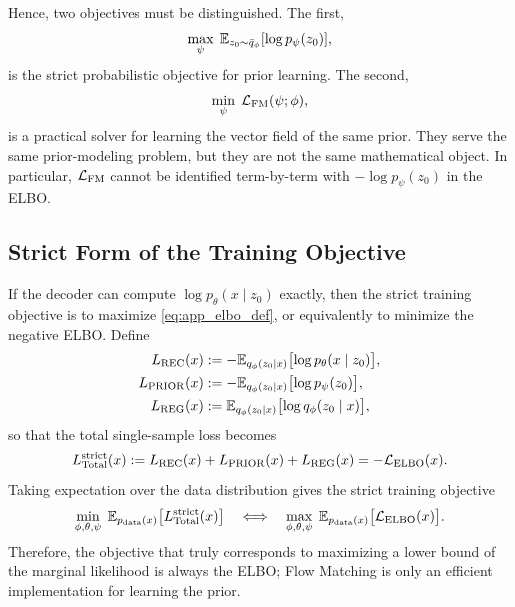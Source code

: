 Hence, two objectives must be distinguished. The first,
\begin{equation}
\max_{\psi}\;\mathbb{E}_{z_0\sim \bar q_{\phi}}[\log p_{\psi}(z_0)],
\label{eq:app_strict_prior_nll}
\end{equation}
is the strict probabilistic objective for prior learning. The second,
\begin{equation}
\min_{\psi}\;\mathcal{L}_{\mathrm{FM}}(\psi;\phi),
\label{eq:app_fm_solver_obj}
\end{equation}
is a practical solver for learning the vector field of the same prior. They serve the same prior-modeling problem, but they are not the same mathematical object. In particular, $\mathcal{L}_{\mathrm{FM}}$ cannot be identified term-by-term with $-\log p_{\psi}(z_0)$ in the ELBO.

\subsection{Strict Form of the Training Objective}
\label{app:training_objective}

If the decoder can compute $\log p_{\theta}(x\mid z_0)$ exactly, then the strict training objective is to maximize \eqref{eq:app_elbo_def}, or equivalently to minimize the negative ELBO. Define
\begin{align}
L_{\mathrm{REC}}(x)
&:= -\mathbb{E}_{q_{\phi}(z_0\mid x)}\bigl[\log p_{\theta}(x\mid z_0)\bigr],
\label{eq:app_l_rec}\\
L_{\mathrm{PRIOR}}(x)
&:= -\mathbb{E}_{q_{\phi}(z_0\mid x)}\bigl[\log p_{\psi}(z_0)\bigr],
\label{eq:app_l_prior}\\
L_{\mathrm{REG}}(x)
&:= \mathbb{E}_{q_{\phi}(z_0\mid x)}\bigl[\log q_{\phi}(z_0\mid x)\bigr],
\label{eq:app_l_reg}
\end{align}
so that the total single-sample loss becomes
\begin{equation}
L_{\mathrm{Total}}^{\mathrm{strict}}(x)
:=
L_{\mathrm{REC}}(x)+L_{\mathrm{PRIOR}}(x)+L_{\mathrm{REG}}(x)
=
-\mathcal{L}_{\mathrm{ELBO}}(x).
\label{eq:app_l_total_strict}
\end{equation}
Taking expectation over the data distribution gives the strict training objective
\begin{equation}
\min_{\phi,\theta,\psi}\;\mathbb{E}_{p_{\mathrm{data}}(x)}\bigl[L_{\mathrm{Total}}^{\mathrm{strict}}(x)\bigr]
\quad\Longleftrightarrow\quad
\max_{\phi,\theta,\psi}\;\mathbb{E}_{p_{\mathrm{data}}(x)}\bigl[\mathcal{L}_{\mathrm{ELBO}}(x)\bigr].
\label{eq:app_strict_training_objective}
\end{equation}
Therefore, the objective that truly corresponds to maximizing a lower bound of the marginal likelihood is always the ELBO; Flow Matching is only an efficient implementation for learning the prior.


